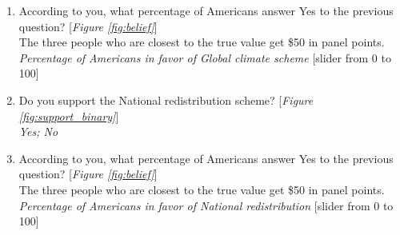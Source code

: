 \begin{enumerate}[resume]
\item \label{q:gcs_belief} According to you, what percentage of Americans answer Yes to the previous question? [\textit{Figure \ref{fig:belief}}]\\
The three people who are closest to the true value get \$50 in panel points.
\\ \textit{Percentage of Americans in favor of Global climate scheme} [slider from 0 to 100]
\item \label{q:nr_support} Do you support the National redistribution scheme? [\textit{Figure \ref{fig:support_binary}}]
\\ \textit{Yes; No}
\item \label{q:nr_belief} According to you, what percentage of Americans answer Yes to the previous question? [\textit{Figure \ref{fig:belief}}]\\
The three people who are closest to the true value get \$50 in panel points.
\\ \textit{Percentage of Americans in favor of National redistribution } [slider from 0 to 100]

\end{enumerate}
